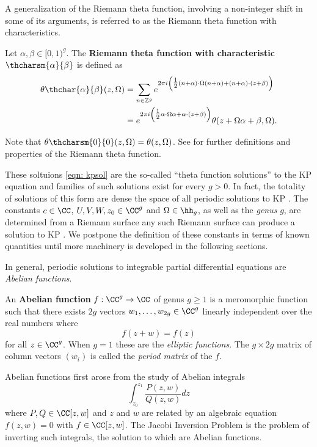 A generalization of the Riemann theta function, involving a non-integer
shift in some of its arguments, is referred to as the Riemann theta
function with characteristics.

\begin{definition} \label{def: thetachar}
Let $\alpha,\beta \in [0,1)^{g}$. The {\bf Riemann theta function with
characteristic $\thcharsm{\alpha}{\beta}$} is defined as
\begin{align*}
  \theta\thchar{\alpha}{\beta}(z, \Omega) &=
  \sum_{n \in \mathbb{Z}^g}
  e^{2 \pi i \left( \tfrac{1}{2} (n+\alpha) \cdot \Omega (n+\alpha) +
    (n + \alpha) \cdot (z + \beta) \right) } \\
  &=
  e^{2\pi i \left( \tfrac{1}{2} \alpha \cdot \Omega \alpha +
    \alpha \cdot (z + \beta) \right)}
  \theta(z + \Omega \alpha + \beta, \Omega).
\end{align*}
\end{definition}

Note that $\theta \thcharsm{0}{0}(z,\Omega) = \theta(z,\Omega)$. See
\cite{NIST:DLMF,MumfordI07,MumfordII07} for further definitions and
properties of the Riemann theta function.

These soltuions \eqref{eqn: kpsol} are the so-called ``theta function
solutions'' to the KP equation and families of such solutions exist for
every $g > 0$. In fact, the totality of solutions of this form are dense
the space of all periodic solutions to KP \cite{Krichever93}. The
constants $c\in\CC$, $U,V,W,z_0 \in \CC^g$ and $\Omega \in \hh_g$, as
well as the {\it genus} $g$, are determined from a Riemann surface any
such Riemann surface can produce a solution to KP \cite{Dubrovin81}. We
postpone the definition of these constants in terms of known quantities
until more machinery is developed in the following sections.

In general, periodic solutions to integrable partial differential
equations are {\it Abelian functions}.
\begin{definition} \label{def: abelian-function}
  An {\bf Abelian function} $f : \CC^g \to \CC$ of genus $g \geq 1$ is a
  meromorphic function such that there exists $2g$ vectors
  $w_1,\ldots,w_{2g} \in \CC^g$ linearly independent over the real
  numbers where
  \[
      f(z + w) = f(z)
  \]
  for all $z \in \CC^g$. When $g=1$ these are the {\it elliptic
    functions}. The $g \times 2g$ matrix of column vectors $(w_i)$ is
  called the {\it period matrix} of the $f$.
\end{definition}
Abelian functions first arose from the study of Abelian integrals
\[
    \int_{z_0}^{z_1} \frac{P(z,w)}{Q(z,w)}dz
\]
where $P,Q \in \CC[z,w]$ and $z$ and $w$ are related by an algebraic
equation $f(z,w) = 0$ with $f \in \CC[z,w]$. The Jacobi Inversion
Problem is the problem of inverting such integrals, the solution to
which are Abelian functions.


